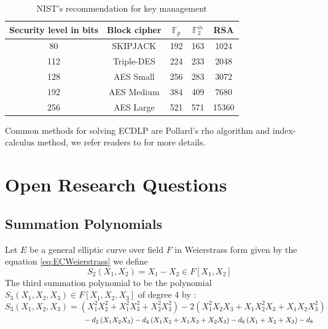 \begin{table}[!h]
	\centering
	\caption{NIST's recommendation for key management }
	\label{tab:nist key length}
	\begin{tabular}{|c|c|c|c|c|}
		\hline
		Security level in bits & Block cipher & $\mathbb{F}_p$  & $\mathbb{F}_2^m$ & RSA   \\ \hline
		80                     & SKIPJACK     & 192 & 163 & 1024  \\ \hline
		112                    & Triple-DES   & 224 & 233 & 2048  \\ \hline
		128                    & AES Small    & 256 & 283 & 3072  \\ \hline
		192                    & AES Medium   & 384 & 409 & 7680  \\ \hline
		256                    & AES Large    & 521 & 571 & 15360 \\ \hline
	\end{tabular}
\end{table}
Common methods for solving ECDLP are Pollard’s rho algorithm and index-calculus method, we refer readers to \cite{hankerson2006guide} for more details.
\section{Open Research Questions}
\subsection{Summation Polynomials} \label{sec:summationPoly}
Let $E$ be a general elliptic curve over field $F$ in Weierstrass form given by the equation \ref{eq:ECWeierstrass} we define $$ S_{2}\left( X_1,X_2\right)  = X_1-X_2 \in F\left[ X_1,X_2 \right] $$ The third summation polynomial to be the polynomial $S_{3}\left( X_1,X_2,X_3\right)  \in F \left[ X_1,X_2,X_3\right]$ of degree 4 by  \cite{kosters2015notes}: 
\begin{equation} \label{eq:general_Semaev}
S_{3}\left( X_1,X_2,X_3 \right) =\left( X_1^2X_2^2+X_1^2X_3^2+X_2^2X_3^2\right) - 2\left( X_1^2X_2X_3+X_1X_2^2X_3+X_1X_2X_3^2\right) 
\end{equation}
$\text{\space\space\space\space\space\space\space\space\space\space\space\space\space\space\space\space\space\space\space\space\space\space\space\space\space\space\space\space\space\space\space\space} -d_2\left(X_1X_2X_3 \right) -d_4\left(X_1X_2+X_1X_3+X_2X_3 \right) -d_6\left( X_1+X_2+X_3\right) -d_8$ \\

